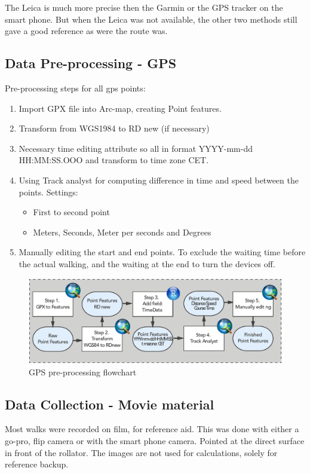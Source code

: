 The Leica is much more precise then the Garmin or the GPS tracker on the smart phone. But when the Leica was not available, the other two methods still gave a good reference as were the route was. 

\subsection{Data Pre-processing - GPS }

Pre-processing steps for all gps points:

\begin{enumerate}
\item Import GPX file into Arc-map, creating Point features. 
\item Transform from WGS1984 to RD new (if necessary)
\item Necessary time editing attribute so all in format YYYY-mm-dd HH:MM:SS.OOO and transform to time zone CET.
\item Using Track analyst for computing difference in time and speed between the points. Settings:
\begin{itemize}
 \item First to second point
 \item Meters, Seconds, Meter per seconds and Degrees
\end{itemize}
\item Manually editing the start and end points. To exclude the waiting time before the actual walking, and the waiting at the end to turn the devices off. 
\end{enumerate}

\begin{figure}[h]
\includegraphics[width=\textwidth]{img/M_preprocessingGPS.pdf}
\centering
\caption{GPS pre-processing flowchart}
\label{gpspp}
\end{figure}

\subsection{Data Collection - Movie material}
Most walks were recorded on film, for reference aid. This was done with either a go-pro, flip camera or with the smart phone camera. Pointed at the direct surface in front of the rollator. The images are not used for calculations, solely for reference backup. 



